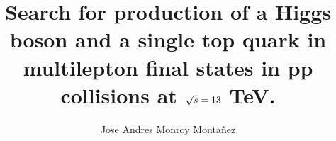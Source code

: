 \documentclass[print]{nuthesis}
\begin{document}
\linenumbers

\renewcommand\bibname{References}
\frontmatter

\title{Search for production of a Higgs boson and a single top quark in multilepton final states in \MakeLowercase{pp} collisions at $\sqrt{\MakeLowercase{s}}=13$ T\MakeLowercase{e}V.}
\author{Jose Andres Monroy Monta{\~n}ez}

\maketitle




\begin{abstract}
 
\end{abstract}





\end{document}

